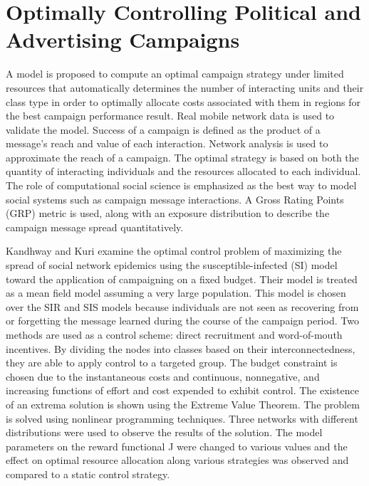 \section{Optimally Controlling Political and Advertising Campaigns}
A model is proposed to compute an optimal campaign strategy under limited resources that automatically determines the number of interacting units and their class type in order to optimally allocate costs associated with them in regions for the best campaign performance result. Real mobile network data is used to validate the model. Success of a campaign is defined as the product of a message's reach and value of each interaction. Network analysis is used to approximate the reach of a campaign. The optimal strategy is based on both the quantity of interacting individuals and the resources allocated to each individual. The role of computational social science is emphasized as the best way to model social systems such as campaign message interactions. A Gross Rating Points (GRP) metric is used, along with an exposure distribution to describe the campaign message spread quantitatively. \cite{altshuler2014campaign}

Kandhway and Kuri examine the optimal control problem of maximizing the spread of social network epidemics using the susceptible-infected (SI) model toward the application of campaigning on a fixed budget. Their model is treated as a mean field model assuming a very large population. This model is chosen over the SIR and SIS models because individuals are not seen as recovering from or forgetting the message learned during the course of the campaign period. Two methods are used as a control scheme: direct recruitment and word-of-mouth incentives. By dividing the nodes into classes based on their interconnectedness, they are able to apply control to a targeted group. The budget constraint is chosen due to the instantaneous costs and continuous, nonnegative, and increasing functions of effort and cost expended to exhibit control. The existence of an extrema solution is shown using the Extreme Value Theorem. The problem is solved using nonlinear programming techniques. Three networks with different distributions were used to observe the results of the solution. The model parameters on the reward functional J were changed to various values and the effect on optimal resource allocation along various strategies was observed and compared to a static control strategy. 

